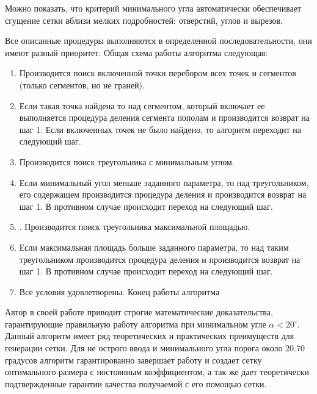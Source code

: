 \documentclass[14pt]{extreport}
\begin{document}
Можно показать, что критерий минимального угла автоматически обеспечивает сгущение сетки вблизи мелких подробностей: отверстий, углов и вырезов. 

Все описанные процедуры выполняются в определенной последовательности, они имеют разный приоритет. Общая схема работы алгоритма следующая:

\begin{enumerate}

\item Производится поиск включенной точки перебором всех точек и сегментов (только сегментов, но не граней).

\item Если такая точка найдена то над сегментом, который включает ее выполняется процедура деления сегмента пополам и производится возврат на шаг 1. Если включенных точек не было найдено, то алгоритм переходит на следующий шаг.

\item Производится поиск треугольника с минимальным углом.

\item Если минимальный угол меньше заданного параметра, то над треугольником, его содержащем производится процедура деления и производится возврат на шаг 1. В противном случае происходит переход на следующий шаг.

\item. Производится поиск треугольника максимальной площадью.

\item Если максимальная площадь больше заданного параметра, то над таким треугольником производится процедура деления и производится возврат на шаг 1. В противном случае происходит переход на следующий шаг.

\item Все условия удовлетворены. Конец работы алгоритма

\end{enumerate}


Автор в своей работе \cite{bib:triangle:ruppert} приводит строгие математические доказательства, гарантирующие правильную работу алгоритма при минимальном угле $\alpha < 20^{\circ}$. Данный алгоритм имеет ряд теоретических и практических преимуществ для генерации сетки.  Для не острого ввода и минимального угла порога около $20.70$ градусов алгоритм гарантированно завершает работу и создает сетку оптимального размера с постоянным коэффициентом, а так же  дает теоретически подтвержденные гарантии качества получаемой с его помощью сетки.
\end{document}
